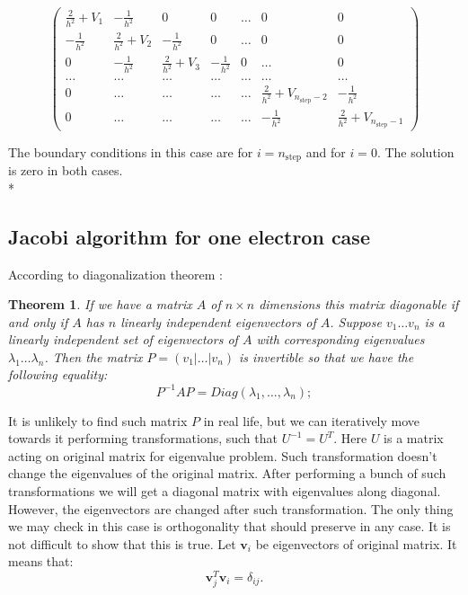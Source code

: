 \documentclass[10pt]{article}
\newtheorem*{theorem}{Theorem}
\begin{document}
\[
\left( 
\begin{array}{ccccccc}
\frac{2}{h^{2}}+V_{1} & -\frac{1}{h^{2}} & 0 & 0 & \dots  & 0 & 0 \\ 
-\frac{1}{h^{2}} & \frac{2}{h^{2}}+V_{2} & -\frac{1}{h^{2}} & 0 & \dots  & 0
& 0 \\ 
0 & -\frac{1}{h^{2}} & \frac{2}{h^{2}}+V_{3} & -\frac{1}{h^{2}} & 0 & \dots 
& 0 \\ 
\dots  & \dots  & \dots  & \dots  & \dots  & \dots  & \dots  \\ 
0 & \dots  & \dots  & \dots  & \dots  & \frac{2}{h^{2}}+V_{n_{\mathrm{step}%
	}-2} & -\frac{1}{h^{2}} \\ 
0 & \dots  & \dots  & \dots  & \dots  & -\frac{1}{h^{2}} & \frac{2}{h^{2}}%
+V_{n_{\mathrm{step}}-1}%
\end{array}%
\right) 
\]

The boundary conditions in this case are for $i=n_{\mathrm{step}}$ and for $%
i=0$. The solution is zero in both cases.\\*
\subsection{Jacobi algorithm for one electron case}
According to diagonalization theorem :
\begin{theorem}

If we have a matrix $ A $ of $ n \times n$ dimensions this matrix diagonable if and only if $ A $ has $ n $ linearly independent eigenvectors of $ A $. Suppose $ v_{1} \dots v_{n} $ is a linearly independent set of eigenvectors of $ A $ with corresponding eigenvalues $ \lambda_{1} \dots \lambda_{n} $. Then the matrix $ P = (v_{1} |\dots |v_{n}) $ is invertible so that we have the following equality:
\begin{equation}
P^{-1}AP=Diag(\lambda_{1},\dots,\lambda_{n});
\end{equation}
\end{theorem}
It is unlikely to find such matrix $ P$ in real life, but we can iteratively move towards it performing transformations, such that $ U^{-1}=U^{T}$. Here $ U $ is a matrix acting on original matrix for eigenvalue problem. Such transformation doesn't change the eigenvalues of the original matrix. After performing a bunch of such transformations we will get a diagonal matrix with eigenvalues along diagonal. However, the eigenvectors are changed after such transformation. The only thing we may check in this case is orthogonality that should preserve in any case. It is not difficult to show that this is true.
Let $\textbf{v}_{i}  $ be eigenvectors of original matrix. It means that:
\begin{equation}
\mathbf{v}_j^T\mathbf{v}_i = \delta_{ij}.
\end{equation}
\end{document}
